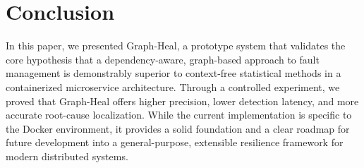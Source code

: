\documentclass[11pt,conference]{IEEEtran}
\begin{document}
\section{Conclusion}
\label{sec:conclusion}
In this paper, we presented Graph-Heal, a prototype system that validates the core hypothesis that a dependency-aware, graph-based approach to fault management is demonstrably superior to context-free statistical methods in a containerized microservice architecture. Through a controlled experiment, we proved that Graph-Heal offers higher precision, lower detection latency, and more accurate root-cause localization. While the current implementation is specific to the Docker environment, it provides a solid foundation and a clear roadmap for future development into a general-purpose, extensible resilience framework for modern distributed systems.



\end{document}
